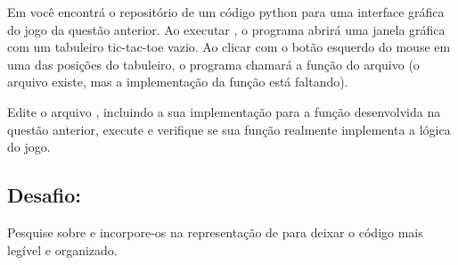 Em  você encontrá o repositório de um código python para uma
interface gráfica do jogo da questão anterior.
Ao executar , o programa abrirá uma janela gráfica com um tabuleiro tic-tac-toe vazio.
Ao clicar com o botão esquerdo do mouse em uma das posições do tabuleiro, o programa chamará a função
 do arquivo  (o arquivo existe, mas a implementação
da função está faltando).

Edite o arquivo , incluindo a sua implementação para a função desenvolvida na
questão anterior, execute  e verifique se sua função realmente implementa a lógica do jogo.

\subsection*{Desafio:}
Pesquise sobre  e incorpore-os na representação de  para deixar o código mais
legível e organizado.